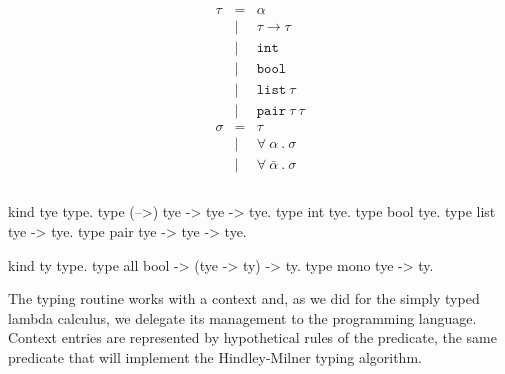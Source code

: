 \documentclass[a4paper, 11pt]{book}
\begin{document}
\begin{center}
\begin{minipage}{0.4\textwidth}
$$
\begin{array}{lrl}
  \\
    \tau   &=     & \alpha                    \\
                              &\vert &  \tau \to \tau         \\
                              &\vert &  \mathtt{int}         \\
                              &\vert &  \mathtt{bool}         \\
                              &\vert &  \mathtt{list}\ \tau         \\
                              &\vert &  \mathtt{pair}\ \tau\ \tau         \\
  
     \sigma &=    & \tau                                           \\
                             &\vert& \forall\ \alpha\ .\ \sigma \\
                            &\vert& \forall\ \bar\alpha\ .\ \sigma \\
  \\
\end{array}
$$
\end{minipage}
\begin{minipage}{0.5\textwidth}
\begin{elpicodelj}
kind tye   type.
type (-->) tye -> tye -> tye.  
type int   tye.
type bool  tye.
type list  tye -> tye.
type pair  tye -> tye -> tye.

kind ty     type.
type all    bool -> (tye -> ty) -> ty.
type mono   tye -> ty.
\end{elpicodelj}
\end{minipage}
\end{center}

The typing routine works with a context and, as we did for the simply typed
lambda calculus, we delegate its management to the programming language.
Context entries are represented by hypothetical rules of the 
predicate, the same predicate that will implement the Hindley-Milner
typing algorithm.
\end{document}
